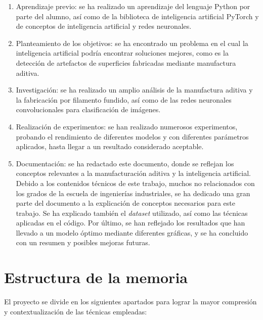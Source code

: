 \documentclass{report}
\begin{document}
\begin{enumerate}
    \item Aprendizaje previo: se ha realizado un aprendizaje del lenguaje Python por parte del alumno, así como de la biblioteca de inteligencia artificial PyTorch y de conceptos de inteligencia artificial y redes neuronales.
    \item Planteamiento de los objetivos: se ha encontrado un problema en el cual la inteligencia artificial podría encontrar soluciones mejores, como es la detección de artefactos de superficies fabricadas mediante manufactura aditiva.
    \item Investigación: se ha realizado un amplio análisis de la manufactura aditiva y la fabricación por filamento fundido, así como de las redes neuronales convolucionales para clasificación de imágenes.
    \item Realización de experimentos: se han realizado numerosos experimentos, probando el rendimiento de diferentes modelos y con diferentes parámetros aplicados, hasta llegar a un resultado considerado aceptable.
    \item Documentación: se ha redactado este documento, donde se reflejan los conceptos relevantes a la manufacturación aditiva y la inteligencia artificial. Debido a los contenidos técnicos de este trabajo, muchos no relacionados con los grados de la escuela de ingenierías industriales, se ha dedicado una gran parte del documento a la explicación de conceptos necesarios para este trabajo. Se ha explicado también el \textit{dataset} utilizado, así como las técnicas aplicadas en el código. Por último, se han reflejado los resultados que han llevado a un modelo óptimo mediante diferentes gráficas, y se ha concluido con un resumen y posibles mejoras futuras.
\end{enumerate}



\section{Estructura de la memoria}

El proyecto se divide en los siguientes apartados para lograr la mayor compresión y contextualización de las técnicas empleadas:
\end{document}
